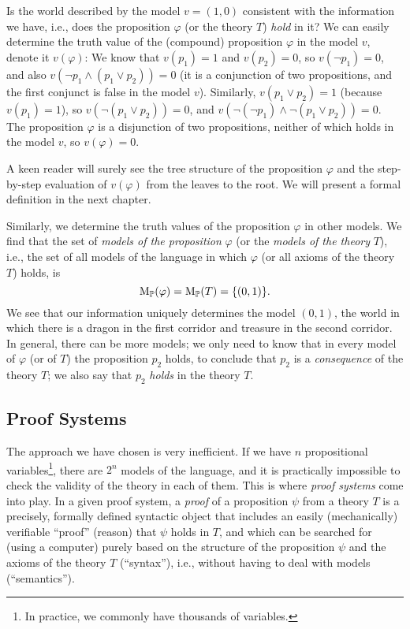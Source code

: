 Is the world described by the model \( v = (1,0) \) consistent with the information we have, i.e., does the proposition \( \varphi \) (or the theory \( T \)) \emph{hold} in it? We can easily determine the truth value of the (compound) proposition \( \varphi \) in the model \(v\), denote it \( v(\varphi) \): We know that \( v(p_1) = 1 \) and \( v(p_2) = 0 \), so \( v(\neg p_1) = 0 \), and also \( v(\neg p_1 \land (p_1 \lor p_2)) = 0 \) (it is a conjunction of two propositions, and the first conjunct is false in the model \( v \)). Similarly, \( v(p_1 \lor p_2) = 1 \) (because \( v(p_1) = 1 \)), so \( v(\neg(p_1 \lor p_2)) = 0 \), and \( v(\neg (\neg p_1) \land \neg (p_1 \lor p_2)) = 0 \). The proposition \( \varphi \) is a disjunction of two propositions, neither of which holds in the model \(v\), so \( v(\varphi) = 0 \).

A keen reader will surely see the tree structure of the proposition \( \varphi \) and the step-by-step evaluation of \( v(\varphi) \) from the leaves to the root. We will present a formal definition in the next chapter.

Similarly, we determine the truth values of the proposition \( \varphi \) in other models. We find that the set of \emph{models of the proposition} \( \varphi \) (or the \emph{models of the theory} \( T \)), i.e., the set of all models of the language in which \( \varphi \) (or all axioms of the theory \( T \)) holds, is
\[
    \operatorname{M}_\mathbb{P}(\varphi) = \operatorname{M}_\mathbb{P}(T) = \{(0,1)\}.
\]
We see that our information uniquely determines the model \( (0,1) \), the world in which there is a dragon in the first corridor and treasure in the second corridor. In general, there can be more models; we only need to know that in every model of \( \varphi \) (or of \(T \)) the proposition \( p_2 \) holds, to conclude that \( p_2 \) is a \emph{consequence} of the theory \( T \); we also say that \( p_2 \) \emph{holds} in the theory \( T \).


\subsection{Proof Systems}

The approach we have chosen is very inefficient. If we have \( n \) propositional variables\footnote{In practice, we commonly have thousands of variables.}, there are \( 2^n \) models of the language, and it is practically impossible to check the validity of the theory in each of them. This is where \emph{proof systems} come into play. In a given proof system, a \emph{proof} of a proposition \( \psi \) from a theory \( T \) is a precisely, formally defined syntactic object that includes an easily (mechanically) verifiable ``proof'' (reason) that \( \psi \) holds in \( T \), and which can be searched for (using a computer) purely based on the structure of the proposition \( \psi \) and the axioms of the theory \( T \) (``syntax''), i.e., without having to deal with models (``semantics'').

